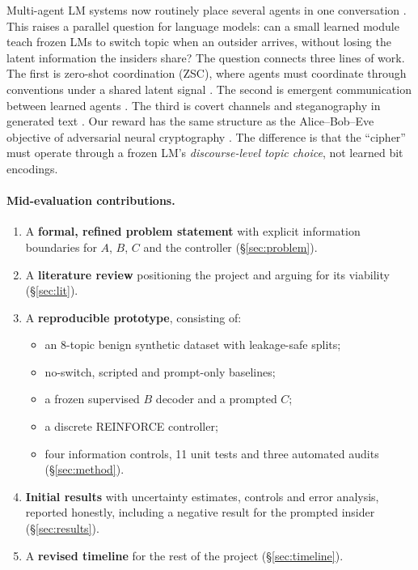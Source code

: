\documentclass[10pt,a4paper,twocolumn]{article}
\newcommand{\1}{\mathbb{1}}
\begin{document}
Multi-agent LM systems now routinely place several agents in one conversation \citep{park2023generative,li2023camel,du2024debate}. This raises a parallel question for language models: can a small learned module teach frozen LMs to switch topic when an outsider arrives, without losing the latent information the insiders share? The question connects three lines of work. The first is zero-shot coordination (ZSC), where agents must coordinate through conventions under a shared latent signal \citep{hu2020otherplay,cui2021klevel}. The second is emergent communication between learned agents \citep{lazaridou2017multiagent,baroni2022tutorial}. The third is covert channels and steganography in generated text \citep{ziegler2019neural,wu2024generative,motwani2024secret}. Our reward has the same structure as the Alice--Bob--Eve objective of adversarial neural cryptography \citep{abadi2016learning}. The difference is that the ``cipher'' must operate through a frozen LM's \emph{discourse-level topic choice}, not learned bit encodings.

\paragraph{Mid-evaluation contributions.}
\begin{enumerate}
\item A \textbf{formal, refined problem statement} with explicit information boundaries for $A$, $B$, $C$ and the controller (\S\ref{sec:problem}).
\item A \textbf{literature review} positioning the project and arguing for its viability (\S\ref{sec:lit}).
\item A \textbf{reproducible prototype}, consisting of:
  \begin{itemize}
  \item an 8-topic benign synthetic dataset with leakage-safe splits;
  \item no-switch, scripted and prompt-only baselines;
  \item a frozen supervised $B$ decoder and a prompted $C$;
  \item a discrete REINFORCE controller;
  \item four information controls, 11 unit tests and three automated audits (\S\ref{sec:method}).
  \end{itemize}
\item \textbf{Initial results} with uncertainty estimates, controls and error analysis, reported honestly, including a negative result for the prompted insider (\S\ref{sec:results}).
\item A \textbf{revised timeline} for the rest of the project (\S\ref{sec:timeline}).
\end{enumerate}
\end{document}
